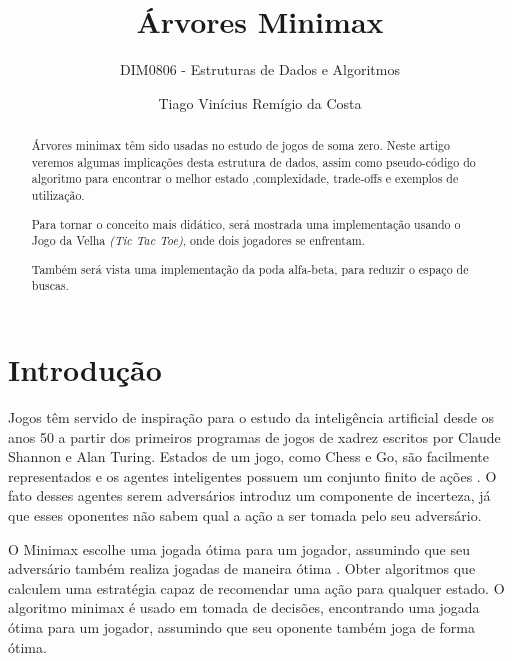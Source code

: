 \documentclass[sigplan,screen]{acmart}
\begin{document}
\title{Árvores Minimax}
\subtitle{DIM0806 - Estruturas de Dados e Algoritmos}

\author{Tiago Vinícius Remígio da Costa}

\begin{abstract}
  Árvores minimax têm sido usadas no estudo de jogos de soma zero.
  Neste artigo veremos algumas implicações desta estrutura de dados, 
  assim como pseudo-código do algoritmo para encontrar o melhor estado ,complexidade, trade-offs e exemplos de utilização. 

  Para tornar o conceito mais didático, será mostrada uma implementação usando o Jogo da Velha {\itshape(Tic Tac Toe)}, onde dois jogadores se enfrentam.

  Também será vista uma implementação da poda alfa-beta, para reduzir o espaço de buscas.
\end{abstract}


\maketitle
\pagestyle{plain}

\section{Introdução}

Jogos têm servido de inspiração para o estudo da inteligência artificial desde os anos 50 a partir dos primeiros programas de jogos de xadrez escritos por Claude Shannon e Alan Turing. 
Estados de um jogo, como Chess e Go, são facilmente representados e os agentes inteligentes possuem um conjunto finito de ações \cite{russel2010}. 
O fato desses agentes serem adversários introduz um componente de incerteza, já que esses oponentes não sabem qual a ação a ser tomada pelo seu adversário.

O Minimax escolhe uma jogada ótima para um jogador, assumindo que seu adversário também realiza jogadas de maneira ótima \cite{Jain17}.
Obter algoritmos que calculem uma estratégia capaz de recomendar uma ação para qualquer estado. 
O algoritmo minimax é usado em tomada de decisões, encontrando uma jogada ótima para um jogador, assumindo que seu oponente também joga de forma ótima.
\end{document}
